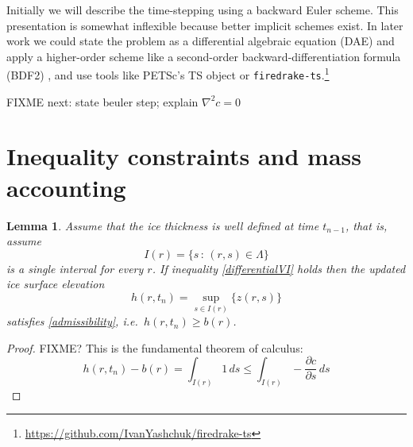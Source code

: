 \documentclass[letterpaper,final,12pt,reqno]{amsart}
\newcommand{\grad}{\nabla}
\newtheorem{lemma}{Lemma}
\begin{document}
Initially we will describe the time-stepping using a backward Euler scheme.  This presentation is somewhat inflexible because better implicit schemes exist.  In later work we could state the problem as a differential algebraic equation (DAE) and apply a higher-order scheme like a second-order backward-differentiation formula (BDF2) \cite{AscherPetzold1998}, and use tools like PETSc's TS object \cite{Balayetal2020,BuelerBook} or \texttt{firedrake-ts}.\footnote{\url{https://github.com/IvanYashchuk/firedrake-ts}}

FIXME next: state beuler step; explain $\grad^2 c = 0$


\section{Inequality constraints and mass accounting}

\begin{lemma}
Assume that the ice thickness is well defined at time $t_{n-1}$, that is, assume
    $$I(r) = \{s\,:\,(r,s) \in \Lambda\}$$
is a single interval for every $r$.  If inequality \eqref{differentialVI} holds then the updated ice surface elevation
    $$h(r,t_n) = \sup_{s\in I(r)}\{z(r,s)\}$$
satisfies \eqref{admissibility}, i.e.~$h(r,t_n)\ge b(r)$.
\end{lemma}

\begin{proof}
FIXME? This is the fundamental theorem of calculus:
    $$h(r,t_n) - b(r) = \int_{I(r)} 1\,ds \le \int_{I(r)} - \frac{\partial c}{\partial s}\,ds$$
\end{proof}
\end{document}
